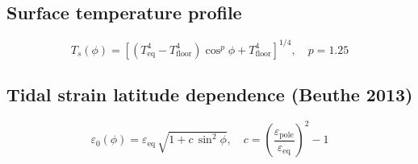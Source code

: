 \documentclass[11pt,a4paper]{article}
\begin{document}
\subsection{Surface temperature profile}
\begin{equation}
T_s(\phi) = \left[
  (T_\mathrm{eq}^4 - T_\mathrm{floor}^4)\cos^p\phi + T_\mathrm{floor}^4
\right]^{1/4}, \quad p = 1.25
\end{equation}

\subsection{Tidal strain latitude dependence (Beuthe 2013)}
\begin{equation}
\varepsilon_0(\phi) = \varepsilon_\mathrm{eq}\,\sqrt{1 + c\,\sin^2\phi},
\quad c = \left(\frac{\varepsilon_\mathrm{pole}}{\varepsilon_\mathrm{eq}}\right)^2 - 1
\end{equation}
\end{document}
